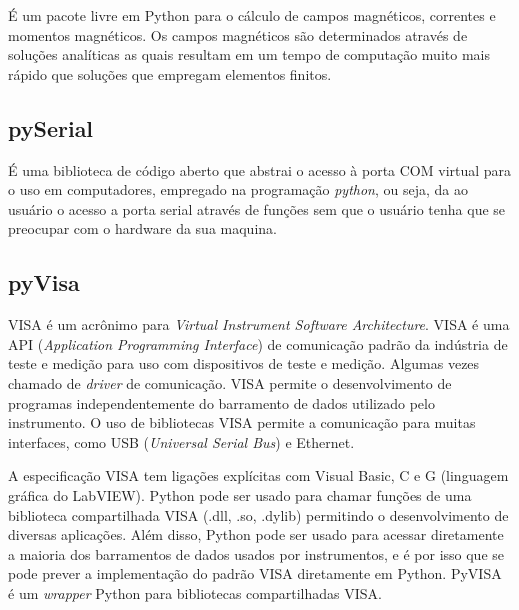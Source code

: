 É um pacote livre em Python para o cálculo de campos magnéticos, correntes e momentos magnéticos. Os campos magnéticos são determinados através de soluções analíticas as quais resultam em um tempo de computação muito mais rápido que soluções que empregam elementos finitos. \cite{magpy2020} 

\subsection{pySerial}

É uma biblioteca de código aberto que abstrai o acesso à porta COM virtual para o uso em computadores, empregado na programação \textit{python}, ou seja, da ao usuário o acesso a porta serial através de funções sem que o usuário tenha que se preocupar com o hardware da sua maquina. \cite{pySerial}

\subsection{pyVisa}

VISA é um acrônimo para \textit{Virtual Instrument Software Architecture}. VISA é uma API (\textit{Application Programming Interface}) de comunicação padrão da indústria de teste e medição para uso com dispositivos de teste e medição. Algumas vezes chamado de \textit{driver} de comunicação. VISA permite o desenvolvimento de programas independentemente do barramento de dados utilizado pelo instrumento. O uso de bibliotecas VISA permite a comunicação para muitas interfaces, como USB (\textit{Universal Serial Bus}) e Ethernet.\cite{visaRef}

A especificação VISA tem ligações explícitas com Visual Basic, C e G (linguagem gráfica do LabVIEW). Python pode ser usado para chamar funções de uma biblioteca compartilhada VISA (.dll, .so, .dylib) permitindo o desenvolvimento de diversas aplicações. Além disso, Python pode ser usado para acessar diretamente a maioria dos barramentos de dados usados por instrumentos, e é por isso que se pode prever a implementação do padrão VISA diretamente em Python. PyVISA é um \textit{wrapper} Python para bibliotecas compartilhadas VISA.\cite{pyvisaRef}
